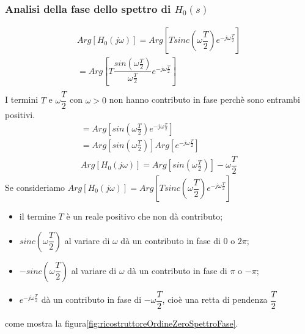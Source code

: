 \documentclass[a4paper]{report}
\begin{document}
\subsubsection{Analisi della fase dello spettro di $H_0(s)$}
\[
\begin{array}{l}
  Arg[H_0(j \omega)] = Arg \left[ T sinc \left(\omega \dfrac{T}{2}
    \right) e^{-j \omega \frac{T}{2}} \right] \\
  = Arg \left[ T \dfrac{sin\left( \omega \frac{T}{2}\right)}{\omega
      \frac{T}{2}} e^{-j \omega \frac{T}{2}} \right]\\
\end{array}
\]
I termini $T$ e $\omega \dfrac{T}{2}$ con $\omega > 0$ non hanno
contributo in fase perch\`e sono entrambi positivi.
\[
\begin{array}{l}
  = Arg \left[ sin\left( \omega \frac{T}{2}\right) e^{-j \omega
      \frac{T}{2}} \right]\\
  = Arg \left[ sin\left( \omega \frac{T}{2}\right) \right] Arg
  \left[e^{-j \omega \frac{T}{2}} \right]\\
  Arg[H_0(j \omega)] = Arg \left[ sin\left( \omega \frac{T}{2}\right)
    \right] - \omega \dfrac{T}{2} 
\end{array}
\]
Se consideriamo $Arg[H_0(j \omega)] = Arg \left[ T sinc \left(\omega
  \dfrac{T}{2} \right) e^{-j \omega \frac{T}{2}} \right]$
\begin{itemize}
\item il termine $T$ \`e un reale positivo che non d\`a contributo;
\item $sinc \left(\omega \dfrac{T}{2} \right)$ al variare di
  $\omega$ d\`a un contributo in fase di 0 o $2 \pi$;
\item $- sinc \left(\omega \dfrac{T}{2} \right)$ al variare di
  $\omega$ d\`a un contributo in fase di $\pi$ o $- \pi$;
\item $e^{-j \omega \frac{T}{2}}$ d\`a un contributo in fase di $-
  \omega \dfrac{T}{2}$, cio\`e una retta di pendenza $\dfrac{T}{2}$
\end{itemize}
come mostra la figura\ref{fig:ricostruttoreOrdineZeroSpettroFase}.
\end{document}
